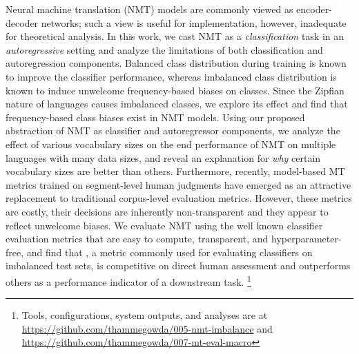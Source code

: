 Neural machine translation (NMT) models are commonly viewed as encoder-decoder networks; such a view is useful for implementation, however, inadequate for theoretical analysis. %
In this work, we cast NMT as a \textit{classification} task in an \textit{autoregressive} setting and analyze the limitations of both classification and autoregression components.
Balanced class distribution during training is known to improve the classifier performance, whereas imbalanced class distribution is known to induce unwelcome frequency-based biases on classes.
Since the Zipfian nature of languages causes imbalanced classes, we explore its effect and find that frequency-based class biases exist in NMT models. 
Using our proposed abstraction of NMT as classifier and autoregressor components, we analyze the effect of various vocabulary sizes on the end performance of NMT on multiple languages with many data sizes, and reveal an explanation for \textit{why} certain vocabulary sizes are better than others.
Furthermore, recently, model-based MT metrics trained on segment-level human judgments have emerged as an attractive replacement to traditional corpus-level evaluation metrics.
However, these metrics are costly, their decisions are inherently non-transparent and they appear to reflect unwelcome biases. 
We evaluate NMT using the well known classifier evaluation metrics that are easy to compute, transparent, and hyperparameter-free, and find that , a metric commonly used for evaluating classifiers on imbalanced test sets, is competitive on direct human assessment and outperforms others as a performance indicator of a downstream task. 
\footnote{Tools, configurations, system outputs, and analyses are at \href{https://github.com/thammegowda/005-nmt-imbalance}{https://github.com/thammegowda/005-nmt-imbalance} and \href{https://github.com/thammegowda/007-mt-eval-macro}{https://github.com/thammegowda/007-mt-eval-macro}} 
